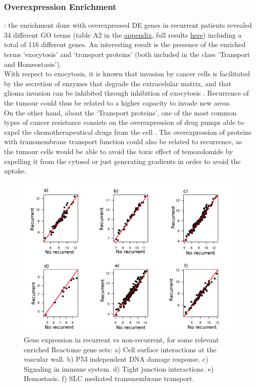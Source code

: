\documentclass[9pt,twocolumn,twoside]{gsajnl}
\begin{document}
\subsubsection*{Overexpression Enrichment}: the enrichment done with overexpressed DE genes in recurrent patients revealed 34 different GO terms (table A2 in the \href{http://ieoproject.tk/ieo/supplementary/appendix.pdf}{appendix}, full results \href{http://ieoproject.tk/ieo/supplementary/go_overexpr_results.html}{here}) including a total of 116 different genes. An interesting result is the presence of the enriched terms `exocytosis' and `transport proteins' (both included in the class `Transport and Homeostasis').\\
With respect to exocytosis, it is known that invasion by cancer cells is facilitated by the secretion of enzymes that degrade the extracelular matrix, and that glioma invasion can be inhibited through inhibition of exocytosis \citep{Liu2012}. Recurrence of the tumour could thus be related to a higher capacity to invade new areas.\\
On the other hand, about the `Transport proteins', one of the most common types of cancer resistance consists on the overexpression of drug pumps able to expel the chemotherapeutical drugs from the cell \citep{Borst2012}. The overexpression of proteins with transmembrane transport function could also be related to recurrence, as the tumour cells would be able to avoid the toxic effect of temozolomide by expelling it from the cytosol or just generating gradients in order to avoid the uptake.
\begin{figure}[!h]
	\centering
	\includegraphics[scale=0.4]{gsea.png}
	\caption{ Gene expression in recurrent vs non-recurrent, for some relevant enriched Reactome gene sets: a) Cell surface interactions at the vascular wall. b) P53 independent DNA damage response. c) Signaling in immune system. d) Tight junction interactions. e) Hemostasis. f) SLC mediated transmembrane transport. }
	\label{fig:gsea}
\end{figure}
\end{document}
